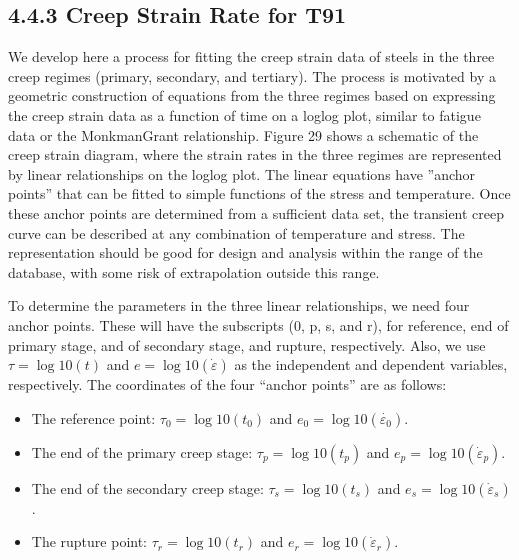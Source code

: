 \documentclass[letterpaper,10pt,english]{jupyterBook}
\begin{document}
	\subsection{4.4.3 Creep Strain Rate for T91}
	\label{\detokenize{4 Mechanical Properties:creep-strain-rate-for-t91}}
	\sphinxAtStartPar
	We develop here a process for fitting the creep strain data of steels in the three creep regimes (primary, secondary, and tertiary). The process is motivated by a geometric construction of equations from the three
	regimes based on expressing the creep strain data as a function of time on a log\sphinxhyphen{}log plot, similar to fatigue data or the Monkman\sphinxhyphen{}Grant relationship. Figure 29 shows a schematic of the creep strain diagram, where the strain rates in the three regimes are represented by linear relationships on the log\sphinxhyphen{}log plot. The linear equations have ”anchor points” that can be fitted to simple functions of the stress and temperature. Once these anchor points are determined from a sufficient data set, the transient creep curve can be described at any combination of temperature and stress. The representation should be good for design and analysis within the range of the database, with some risk of extrapolation outside this range.
	
	
	
	\sphinxAtStartPar
	To determine the parameters in the three linear relationships, we need four anchor points.  These will have the subscripts (0, p, s, and r), for reference, end of primary stage, and of secondary stage, and rupture, respectively.  Also, we use \(\tau=\log10(t)\) and \(e=\log10(\dot{\varepsilon})\) as the independent and dependent variables, respectively. The coordinates of the four “anchor points” are as follows:
	\begin{itemize}
		\item {} 
		\sphinxAtStartPar
		The reference point: \(\tau_0=\log10(t_0)\) and \(e_0=\log10(\dot{\varepsilon_0})\).
		
		\item {} 
		\sphinxAtStartPar
		The end of the primary creep stage: \(\tau_p=\log10(t_p)\) and \(e_p=\log10(\dot{\varepsilon}_p)\).
		
		\item {} 
		\sphinxAtStartPar
		The end of the secondary creep stage: \(\tau_s=\log10(t_s)\) and \(e_s=\log10(\dot{\varepsilon}_s)\).
		
		\item {} 
		\sphinxAtStartPar
		The rupture point: \(\tau_r=\log10(t_r)\) and \(e_r=\log10(\dot{\varepsilon}_r)\).
		
	\end{itemize}
	
\end{document}
